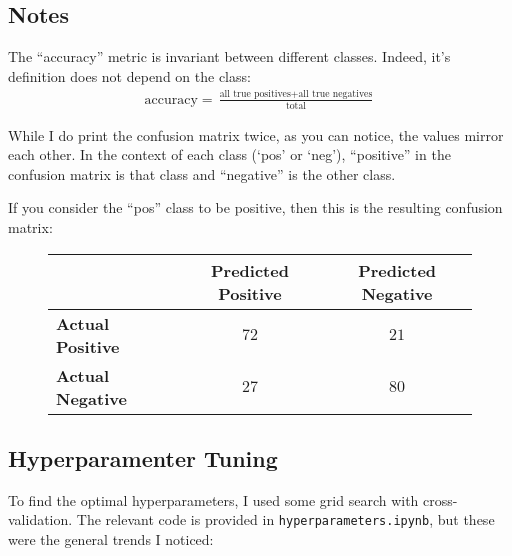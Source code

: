 \subsection{Notes}

\begin{enumarabic}
  \item The ``accuracy'' metric is invariant between different classes.
    Indeed, it's definition does not depend on the class:
    \begin{align}
      \text{accuracy} = \frac{\text{all true positives} + \text{all true negatives}}{\text{total}}
    \end{align}
  \item While I do print the confusion matrix twice,
  as you can notice, the values mirror each other.
  In the context of each class (`pos' or `neg'),
  ``positive'' in the confusion matrix is that class and ``negative'' is the other class.
  
  If you consider the ``pos'' class to be positive,
  then this is the resulting confusion matrix:
  
  \begin{figure}[H]
    \begin{center}
      \begin{tabular}{l | c | c}
                                 & \textbf{Predicted Positive} & \textbf{Predicted Negative} \\
        \midrule
        \textbf{Actual Positive} & $72$ & $21$ \\
        \midrule
        \textbf{Actual Negative} & $27$ & $80$ \\
        \midrule     
      \end{tabular}
    \end{center}
  \end{figure}
\end{enumarabic}

\subsection{Hyperparamenter Tuning}

To find the optimal hyperparameters, I used some grid search with cross-validation.
The relevant code is provided in \verb|hyperparameters.ipynb|,
but these were the general trends I noticed:

